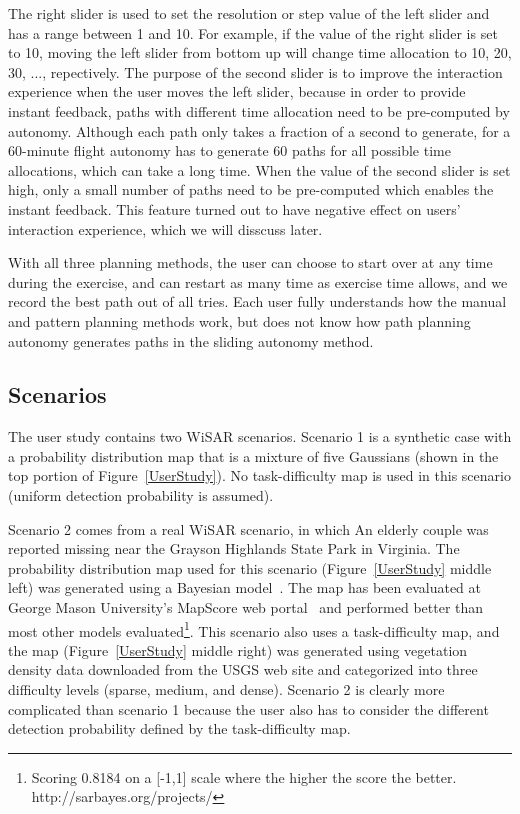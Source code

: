 \documentclass[journal]{IEEEtran}
\begin{document}
The right slider is used to set the resolution or step value of the left slider and has a range between 1 and 10. For example, if the value of the right slider is set to 10, moving the left slider from bottom up will change time allocation to 10, 20, 30, ..., repectively. The purpose of the second slider is to improve the interaction experience when the user moves the left slider, because in order to provide instant feedback, paths with different time allocation need to be pre-computed by autonomy. Although each path only takes a fraction of a second to generate, for a 60-minute flight autonomy has to generate 60 paths for all possible time allocations, which can take a long time. When the value of the second slider is set high, only a small number of paths need to be pre-computed which enables the instant feedback. This feature turned out to have negative effect on users' interaction experience, which we will disscuss later.

With all three planning methods, the user can choose to start over at any time during the exercise, and can restart as many time as exercise time allows, and we record the best path out of all tries. Each user fully understands how the manual and pattern planning methods work, but does not know how path planning autonomy generates paths in the sliding autonomy method.

\subsection{Scenarios}

The user study contains two WiSAR scenarios. Scenario 1 is a synthetic case with a probability distribution map that is a mixture of five Gaussians (shown in the top portion of Figure~\ref{UserStudy}). No task-difficulty map is used in this scenario (uniform detection probability is assumed). 

Scenario 2 comes from a real WiSAR scenario, in which An elderly couple was reported missing near the Grayson Highlands State Park in Virginia. The probability distribution map used for this scenario (Figure~\ref{UserStudy} middle left) was generated using a Bayesian model~\cite{Lin2010Bayesian}. The map has been evaluated at George Mason University's MapScore web portal~\cite{Twardy2012MapScore} and performed better than most other models evaluated\footnote{Scoring 0.8184 on a [-1,1] scale where the higher the score the better. http://sarbayes.org/projects/}. This scenario also uses a task-difficulty map, and the map (Figure~\ref{UserStudy} middle right) was generated using vegetation density data downloaded from the USGS web site and categorized into three difficulty levels (sparse, medium, and dense).	Scenario 2 is clearly more complicated than scenario 1 because the user also has to consider the different detection probability defined by the task-difficulty map.
\end{document}
